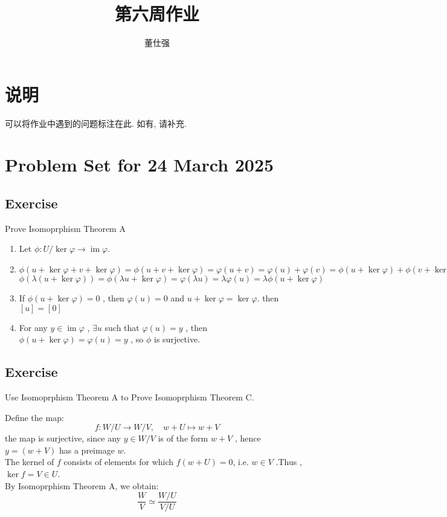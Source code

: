 \documentclass[11pt]{ctexart}
\title{第六周作业}
\author{董仕强}
\theoremstyle{definition}
\numberwithin{equation}{section}
\newcommand{\op}[1]{\operatorname{#1}}%
\theoremstyle{definition}
\theoremstyle{remark}
\begin{document}
\maketitle

\section{说明}

可以将作业中遇到的问题标注在此. 如有, 请补充.

\tableofcontents

\newpage


\section{Problem Set for 24 March 2025}
\subsection{Exercise}
Prove Isomoprphism Theorem A
\begin{aaa}
    \begin{enumerate}
        \item  Let $\phi:U/\ker\varphi \to \op{im} \varphi$.
        \item $\phi(u+\ker\varphi+v+\ker\varphi)=\phi(u+v+\ker\varphi)=\varphi(u+v)=\varphi(u)+\varphi(v)=\phi(u+\ker\varphi)+\phi(v+\ker\varphi)$\\$\phi(\lambda(u+\ker\varphi))=\phi(\lambda u+\ker\varphi)=\varphi(\lambda u)=\lambda \varphi(u)=\lambda \phi(u+\ker\varphi)$
        \item If $\phi(u+\ker\varphi)=0$ , then $\varphi(u)=0$ and $u+\ker\varphi=\ker\varphi$. then $[u]=[0]$
        \item For any $y\in \op{im}\varphi$ , $\exists u$ such that $\varphi(u)=y$ , then $\phi(u+\ker\varphi)=\varphi(u)=y$ , so $\phi$ is surjective.
    \end{enumerate}
\end{aaa}
\subsection{Exercise}
Use Isomoprphism Theorem A to Prove Isomoprphism Theorem C.
\begin{aaa}
    Define the map:\[f:W/U \to W/V,\quad w+U \mapsto w+V\]
    the map is surjective, since any $y \in W/V$ is of the form $w+V$ , hence $y=(w+V)$ has a preimage $w$.
    \\
    The kernel of $f$ consists of elements for which $f(w+U)=0$, i.e. $w \in V$ .Thus , $\ker f= V\in U$.\\
    By Isomoprphism Theorem A, we obtain:\[\frac WV \simeq \frac{W/U}{V/U}\]
\end{aaa}
\end{document}
